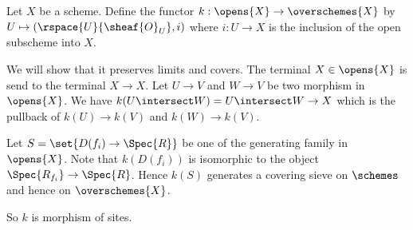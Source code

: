 \begin{definition}[k]
Let $X$ be a scheme.
Define the functor $k:\opens{X} \rightarrow \overschemes{X}$
by $U \mapsto (\rspace{U}{\sheaf{O}_U},i)$
where $i: U\rightarrow X$ is the inclusion of the open subscheme into $X$.

We will show that it preserves limits and covers.
The terminal $X \in \opens{X}$ is send to the terminal $X \rightarrow X$.
Let $U\rightarrow V$ and $W\rightarrow V$ be two morphism in $\opens{X}$.
We have $k(U\intersect W) = U \intersect W \rightarrow X$ which is the pullback
of $k(U) \rightarrow k(V)$ and $k(W) \rightarrow k(V)$. 

Let $S= \set{D(f_i) \rightarrow \Spec{R}}$ be one of the generating family in $\opens{X}$.
Note that $k(D(f_i))$ is isomorphic to the object $\Spec{R_{f_i}} \rightarrow \Spec{R}$.
Hence $k(S)$ generates a covering sieve on $\schemes$ and hence on $\overschemes{X}$.

So $k$ is morphism of sites.
\end{definition}